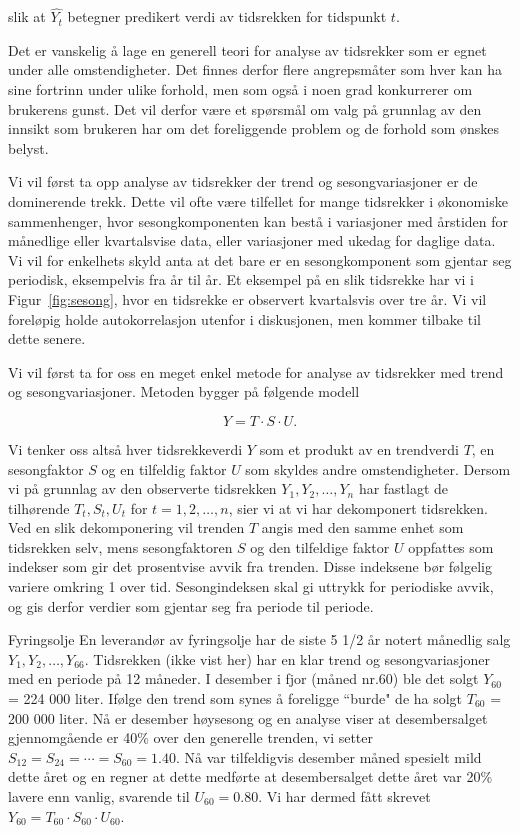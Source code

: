 \noindent slik at $\hat{Y_t}$ betegner predikert verdi av tidsrekken for
tidspunkt $t$.

Det er vanskelig å lage en generell teori for analyse av
tidsrekker som er egnet under alle omstendigheter. Det finnes derfor flere 
angrepsmåter som hver kan ha sine fortrinn under ulike forhold, men som
også i noen grad konkurrerer om brukerens gunst.  Det vil derfor være
et spørsmål om valg på grunnlag av den innsikt som brukeren har 
om det foreliggende problem og de forhold som ønskes belyst.


Vi vil først ta opp analyse av tidsrekker der trend og sesongvariasjoner
er de dominerende trekk.  Dette vil ofte være tilfellet for mange
tidsrekker i økonomiske sammenhenger, hvor sesongkomponenten kan bestå
i varia\-sjoner med årstiden for månedlige eller kvartalsvise data, eller 
variasjoner med ukedag for daglige data.  Vi vil for enkelhets skyld anta at det
bare er en sesongkomponent som gjentar seg periodisk, eksempelvis fra år
til år.  Et eksempel på en slik tidsrekke har vi i Figur~\ref{fig:sesong}, hvor en
tidsrekke er observert kvartalsvis over tre år.  Vi vil foreløpig
holde autokorrelasjon utenfor i diskusjonen, men kommer tilbake til dette
senere.

Vi vil først ta for oss en meget enkel metode for analyse av tidsrekker
med trend og sesongvariasjoner.  Metoden bygger på følgende modell

\[     Y=T \cdot S \cdot U .  \]

\noindent Vi tenker oss altså hver tidsrekkeverdi $Y$ som et produkt av en 
trendverdi $T$, en sesongfaktor $S$ og en tilfeldig faktor $U$ som skyldes
andre omstendigheter.  Dersom vi på grunnlag av den observerte tidsrekken
$Y_1, Y_2, \ldots, Y_n$ har fastlagt de tilhørende $T_t, S_t, U_t$ for
$t = 1, 2, \ldots, n$, sier vi at vi har dekomponert tidsrekken.  Ved en slik
dekomponering vil trenden $T$ angis med den samme enhet som tidsrekken selv,
mens sesongfaktoren $S$ og den tilfeldige faktor $U$ oppfattes som indekser
som gir det prosentvise avvik fra trenden.  Disse indeksene bør 
følgelig variere omkring 1 over tid.  Sesongindeksen skal gi uttrykk for
periodiske avvik, og gis derfor verdier som gjentar seg fra periode til
periode.\\

\begin{eksempel}{Fyringsolje}
En leverandør av fyringsolje har de siste 5 1/2 år notert
månedlig salg $Y_1,Y_2,\ldots, Y_{66}$.  Tidsrekken (ikke vist her)
har en klar trend og sesong\-varia\-sjoner med en periode på 12 måneder. I
desember i fjor (måned nr.60) ble det solgt $Y_{60} $ = 224 000 liter. 
Ifølge den trend som synes å foreligge ``burde" de ha solgt
$T_{60}$ = 200 000 liter.  Nå er desember høysesong og en analyse viser
at desembersalget gjennomgående er 40\% over den generelle trenden, vi
setter  $S_{12} = S_{24}=\cdots = S_{60} = 1.40$. 
Nå var tilfeldigvis desember måned spesielt 
mild dette året og en regner at dette medførte at desembersalget 
dette året var 20\% lavere enn vanlig, svarende til $U_{60} = 0.80$.
Vi har dermed fått skrevet $Y_{60} = T_{60} \cdot S_{60} \cdot U_{60}$.
\end{eksempel}

